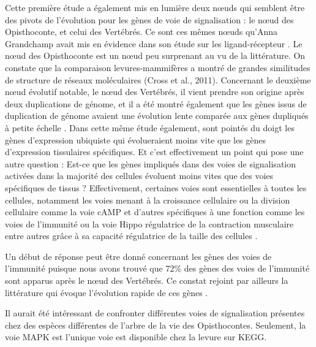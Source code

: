 \par Cette première étude a également mis en lumière deux nœuds qui semblent être des pivots de l’évolution pour les gènes de voie de signalisation : le nœud des Opisthoconte, et celui des Vertébrés. Ce sont ces mêmes nœuds qu’Anna Grandchamp avait mis en évidence dans son étude sur les ligand-récepteur \parencite{grandchamp_synchronous_2018}. Le nœud des Opisthoconte est un nœud peu surprenant au vu de la littérature. On constate que la comparaison levures-mammifères a montré de grandes similitudes de structure de réseaux moléculaires (Cross et al., 2011). Concernant le deuxième nœud évolutif notable, le nœud des Vertébrés, il vient prendre son origine après deux duplications de génome, et il a été montré également que les gènes issus de duplication de génome avaient une évolution lente comparée aux gènes dupliqués à petite échelle \parencite{satake_evolution_2012}. Dans cette même étude également, sont pointés du doigt les gènes d’expression ubiquiste qui évolueraient moins vite que les gènes d’expression tissulaires spécifiques. Et c’est effectivement un point qui pose une autre question : Est-ce que les gènes impliqués dans des voies de signalisation activées dans la majorité des cellules évoluent moins vites que des voies spécifiques de tissus ? Effectivement, certaines voies sont essentielles à toutes les cellules, notamment les voies menant à la croissance cellulaire ou la division cellulaire comme la voie cAMP \parencite{sassone-corsi_cyclic_2012} et d’autres spécifiques à une fonction comme les voies de l’immunité ou la voie Hippo régulatrice de la contraction musculaire entre autres grâce à sa capacité régulatrice de la taille des cellules \parencite{zhao_hippo_2011}. 
\par Un début de réponse peut être donné concernant les gènes des voies de l’immunité puisque nous avons trouvé que 72\% des gènes des voies de l’immunité sont apparus après le nœud des Vertébrés. Ce constat rejoint par ailleurs la littérature qui évoque l’évolution rapide de ces gènes \parencite{cooper_evolution_2006, schlesinger_coevolutionary_2014}. 
\par Il aurait été intéressant de confronter différentes voies de signalisation présentes chez des espèces différentes de l’arbre de la vie des Opisthocontes. Seulement, la voie MAPK est l’unique voie est disponible chez la levure sur KEGG.
